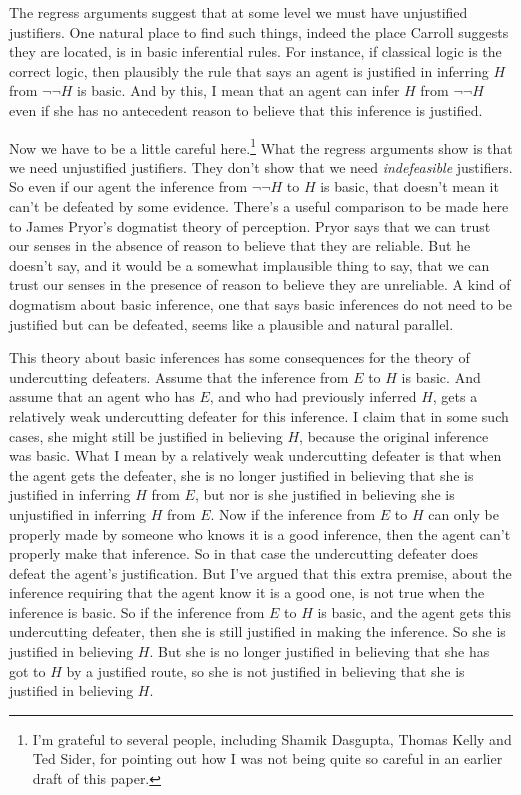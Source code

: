 The regress arguments suggest that at some level we must have unjustified justifiers. One natural place to find such things, indeed the place Carroll suggests they are located, is in basic inferential rules. For instance, if classical logic is the correct logic, then plausibly the rule that says an agent is justified in inferring \(H\) from \(\neg \neg H\) is basic. And by this, I mean that an agent can infer \(H\) from \(\neg \neg H\) even if she has no antecedent reason to believe that this inference is justified.

Now we have to be a little careful here.\footnote{I'm grateful to several people, including Shamik Dasgupta, Thomas Kelly and Ted Sider, for pointing out how I was not being quite so careful in an earlier draft of this paper.} What the regress arguments show is that we need unjustified justifiers. They don't show that we need \textit{indefeasible} justifiers. So even if our agent the inference from  \(\neg \neg H\)  to \(H\) is basic, that doesn't mean it can't be defeated by some evidence. There's a useful comparison to be made here to James Pryor's dogmatist theory of perception. Pryor says that we can trust our senses in the absence of reason to believe that they are reliable. But he doesn't say, and it would be a somewhat implausible thing to say, that we can trust our senses in the presence of reason to believe they are unreliable. A kind of dogmatism about basic inference, one that says basic inferences do not need to be justified but can be defeated, seems like a plausible and natural parallel.

This theory about basic inferences has some consequences for the theory of undercutting defeaters. Assume that the inference from \(E\) to \(H\) is basic. And assume that an agent who has \(E\), and who had previously inferred \(H\), gets a relatively weak undercutting defeater for this inference. I claim that in some such cases, she might still be justified in believing \(H\), because the original inference was basic. What I mean by a relatively weak undercutting defeater is that when the agent gets the defeater, she is no longer justified in believing that she is justified in inferring \(H\) from \(E\), but nor is she justified in believing she is unjustified in inferring \(H\) from \(E\). Now if the inference from \(E\) to \(H\) can only be properly made by someone who knows it is a good inference, then the agent can't properly make that inference. So in that case the undercutting defeater does defeat the agent's justification. But I've argued that this extra premise, about the inference requiring that the agent know it is a good one, is not true when the inference is basic. So if the inference from \(E\) to \(H\) is basic, and the agent gets this undercutting defeater, then she is still justified in making the inference. So she is justified in believing \(H\). But she is no longer justified in believing that she has got to \(H\) by a justified route, so she is not justified in believing that she is justified in believing \(H\).

